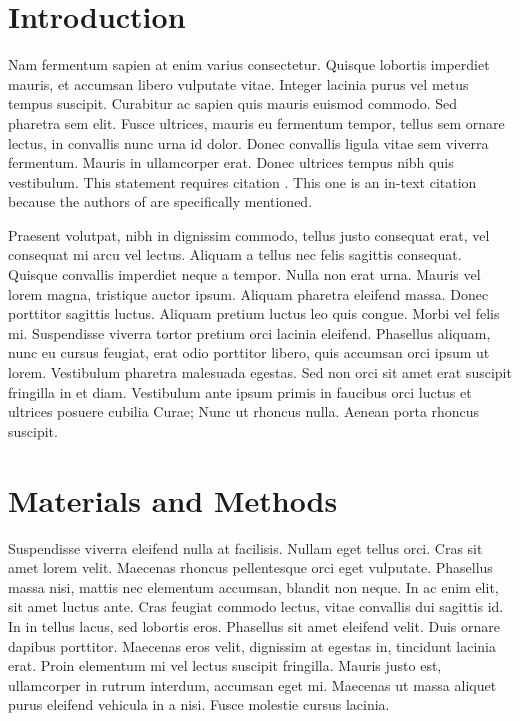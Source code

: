 \documentclass[draft,wrr]{AGUTeX}
\begin{document}

\begin{article}

\section{Introduction}

Nam fermentum sapien at enim varius consectetur. Quisque lobortis imperdiet mauris, et accumsan libero vulputate vitae. Integer lacinia purus vel metus tempus suscipit. Curabitur ac sapien quis mauris euismod commodo. Sed pharetra sem elit. Fusce ultrices, mauris eu fermentum tempor, tellus sem ornare lectus, in convallis nunc urna id dolor. Donec convallis ligula vitae sem viverra fermentum. Mauris in ullamcorper erat. Donec ultrices tempus nibh quis vestibulum. This statement requires citation \citep{AtkinsonSloan}. This one is an in-text citation because the authors of \citet{ColtonKress1} are specifically mentioned.

Praesent volutpat, nibh in dignissim commodo, tellus justo consequat erat, vel consequat mi arcu vel lectus. Aliquam a tellus nec felis sagittis consequat. Quisque convallis imperdiet neque a tempor. Nulla non erat urna. Mauris vel lorem magna, tristique auctor ipsum. Aliquam pharetra eleifend massa. Donec porttitor sagittis luctus. Aliquam pretium luctus leo quis congue. Morbi vel felis mi. Suspendisse viverra tortor pretium orci lacinia eleifend. Phasellus aliquam, nunc eu cursus feugiat, erat odio porttitor libero, quis accumsan orci ipsum ut lorem. Vestibulum pharetra malesuada egestas. Sed non orci sit amet erat suscipit fringilla in et diam. Vestibulum ante ipsum primis in faucibus orci luctus et ultrices posuere cubilia Curae; Nunc ut rhoncus nulla. Aenean porta rhoncus suscipit.


\section{Materials and Methods}

Suspendisse viverra eleifend nulla at facilisis. Nullam eget tellus orci. Cras sit amet lorem velit. Maecenas rhoncus pellentesque orci eget vulputate. Phasellus massa nisi, mattis nec elementum accumsan, blandit non neque. In ac enim elit, sit amet luctus ante. Cras feugiat commodo lectus, vitae convallis dui sagittis id. In in tellus lacus, sed lobortis eros. Phasellus sit amet eleifend velit. Duis ornare dapibus porttitor. Maecenas eros velit, dignissim at egestas in, tincidunt lacinia erat. Proin elementum mi vel lectus suscipit fringilla. Mauris justo est, ullamcorper in rutrum interdum, accumsan eget mi. Maecenas ut massa aliquet purus eleifend vehicula in a nisi. Fusce molestie cursus lacinia.


\end{article}
\end{document}

